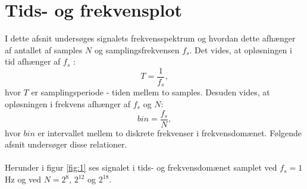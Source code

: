 \section{Tids- og frekvensplot}
I dette afsnit undersøges signalets frekvensspektrum og hvordan dette afhænger af antallet af samples $N$ og samplingsfrekvensen $f_s$. Det vides, at opløsningen i tid afhænger af $f_s$ :
\begin{equation}\label{eq:tidsoploesning}
T = \frac{1}{f_s},
\end{equation}
hvor $T$ er samplingsperiode - tiden mellem to samples. Desuden vides, at opløsningen i frekvens afhænger af $f_s$ og $N$:
\begin{equation}\label{eq:frekvensoploesning}
bin=\frac{f_s}{N},
\end{equation}
hvor $bin$ er intervallet mellem to diskrete frekvenser i frekvensdomænet. Følgende afsnit undersøger disse relationer.\\\\
Herunder i figur \ref{fig:1} ses signalet i tids- og frekvensdomænet samplet ved $f_s=1$ Hz og ved $N=2^8$, $2^{12}$ og $2^{18}$.
